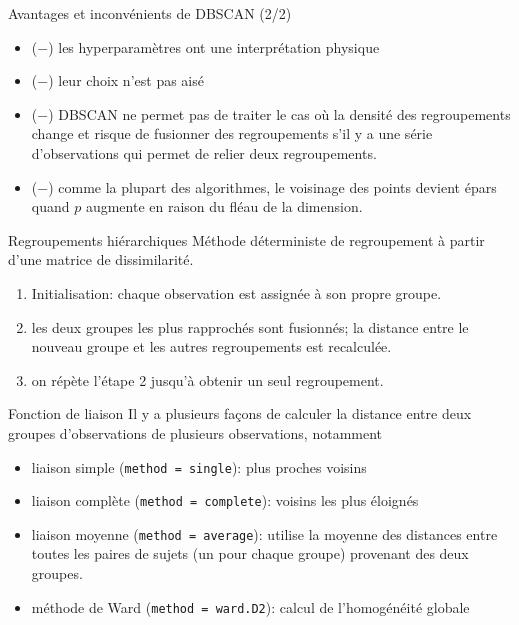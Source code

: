 \documentclass[
  ignorenonframetext,
]{beamer}
\providecommand{\tightlist}{%
  \setlength{\itemsep}{0pt}\setlength{\parskip}{0pt}}\usepackage{longtable,booktabs,array}
\begin{document}
\begin{frame}{Avantages et inconvénients de DBSCAN (2/2)}
\protect\hypertarget{avantages-et-inconvuxe9nients-de-dbscan-22}{}
\begin{itemize}
\tightlist
\item
  (\(-\)) les hyperparamètres ont une interprétation physique
\item
  (\(-\)) leur choix n'est pas aisé
\item
  (\(-\)) DBSCAN ne permet pas de traiter le cas où la densité des
  regroupements change et risque de fusionner des regroupements s'il y a
  une série d'observations qui permet de relier deux regroupements.
\item
  (\(-\)) comme la plupart des algorithmes, le voisinage des points
  devient épars quand \(p\) augmente en raison du fléau de la dimension.
\end{itemize}
\end{frame}

\begin{frame}{Regroupements hiérarchiques}
\protect\hypertarget{regroupements-hiuxe9rarchiques}{}
Méthode déterministe de regroupement à partir d'une matrice de
dissimilarité.

\begin{enumerate}
\tightlist
\item
  Initialisation: chaque observation est assignée à son propre groupe.
\item
  les deux groupes les plus rapprochés sont fusionnés; la distance entre
  le nouveau groupe et les autres regroupements est recalculée.
\item
  on répète l'étape 2 jusqu'à obtenir un seul regroupement.
\end{enumerate}
\end{frame}

\begin{frame}[fragile]{Fonction de liaison}
\protect\hypertarget{fonction-de-liaison}{}
Il y a plusieurs façons de calculer la distance entre deux groupes
d'observations de plusieurs observations, notamment

\begin{itemize}
\tightlist
\item
  liaison simple (\texttt{method\ =\ single}): plus proches voisins
\item
  liaison complète (\texttt{method\ =\ complete}): voisins les plus
  éloignés
\item
  liaison moyenne (\texttt{method\ =\ average}): utilise la moyenne des
  distances entre toutes les paires de sujets (un pour chaque groupe)
  provenant des deux groupes.
\item
  méthode de Ward (\texttt{method\ =\ ward.D2}): calcul de l'homogénéité
  globale
\end{itemize}
\end{frame}
\end{document}
